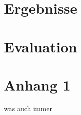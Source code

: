 \documentclass[a4paper,ngerman,naustrian,DIV=12,BCOR=1cm]{scrbook}
\begin{document}
\Blindtext


\chapter{Ergebnisse}

\renewcommand{\kapitelautor}{Autor: Susi Sorglos}

\blindmathpaper\Blindtext


\chapter{Evaluation}

\renewcommand{\kapitelautor}{Autor: Blindtext}

\Blindtext

\Blinddocument\Blindtext\Blinddocument[2]\Blindtext\Blinddocument[5]\Blindtext\Blinddocument[10]\Blindtext\Blindtext

\renewcommand{\kapitelautor}{}

\appendix

\chapter{Anhang 1\label{chap:Anhang-1}}

was auch immer

\printindex{}




\printglossary[type=\acronymtype]
\printglossary
\end{document}
